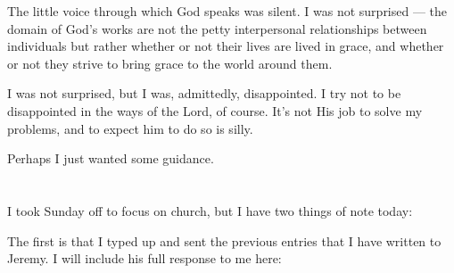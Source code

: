The little voice through which God speaks was silent. I was not surprised --- the domain of God's works are not the petty interpersonal relationships between individuals but rather whether or not their lives are lived in grace, and whether or not they strive to bring grace to the world around them.

I was not surprised, but I was, admittedly, disappointed. I try not to be disappointed in the ways of the Lord, of course. It's not His job to solve my problems, and to expect him to do so is silly.

Perhaps I just wanted some guidance.

\section{}

I took Sunday off to focus on church, but I have two things of note today:

The first is that I typed up and sent the previous entries that I have written to Jeremy. I will include his full response to me here:

